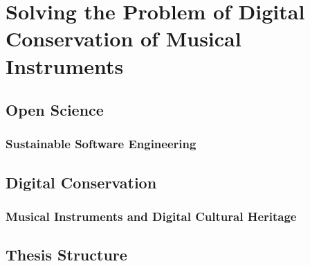 
%
%
%


\chapter{Solving the Problem of Digital Conservation of Musical Instruments}
\label{chapter1}

\section{Open Science}

\subsection{Sustainable Software Engineering}

\section{Digital Conservation}

\subsection{Musical Instruments and Digital Cultural Heritage}

\section{Thesis Structure}

